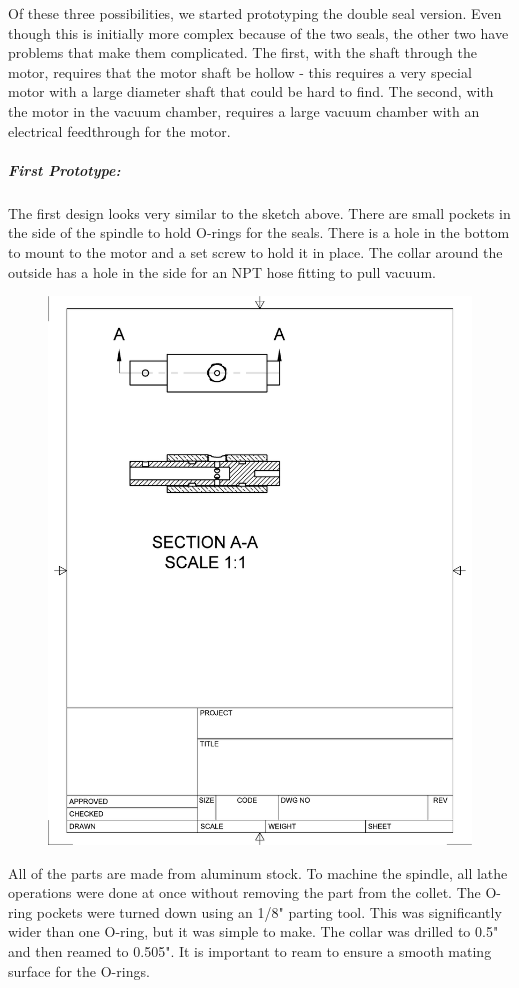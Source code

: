 \documentclass[12pt]{report}
\begin{document}
Of these three possibilities, we started prototyping the double seal version. Even though this is initially more complex because of the two seals, the other two have problems that make them complicated. The first, with the shaft through the motor, requires that the motor shaft be hollow - this requires a very special motor with a large diameter shaft that could be hard to find. The second, with the motor in the vacuum chamber, requires a large vacuum chamber with an electrical feedthrough for the motor. 
\subparagraph{First Prototype:} The first design looks very similar to the sketch above. There are small pockets in the side of the spindle to hold O-rings for the seals. There is a hole in the bottom to mount to the motor and a set screw to hold it in place. The collar around the outside has a hole in the side for an NPT hose fitting to pull vacuum.
\begin{figure}[h]
\includegraphics{rev1}
\end{figure}
All of the parts are made from aluminum stock. To machine the spindle, all lathe operations were done at once without removing the part from the collet. The O-ring pockets were turned down using an 1/8" parting tool. This was significantly wider than one O-ring, but it was simple to make. The collar was drilled to 0.5" and then reamed to 0.505". It is important to ream to ensure a smooth mating surface for the O-rings. \\
\end{document}

